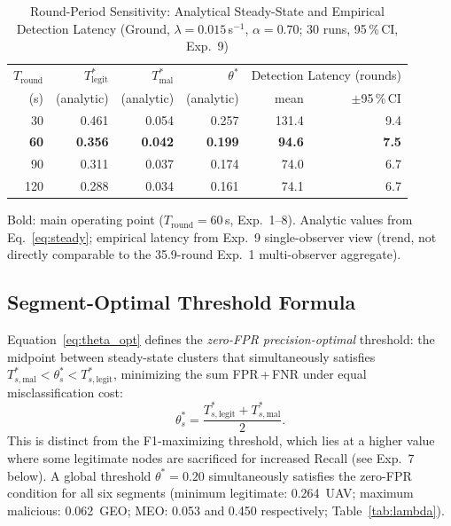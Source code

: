 \documentclass[journal,twoside,10pt]{IEEEtran}
\begin{document}
\begin{table}[t]
\centering
\caption{Round-Period Sensitivity: Analytical Steady-State and
         Empirical Detection Latency (Ground, $\lambda\!=\!0.015$\,s$^{-1}$,
         $\alpha\!=\!0.70$; 30 runs, 95\,\%\,CI, Exp.~9)}
\label{tab:tround_sensitivity}
\renewcommand{\arraystretch}{1.1}
\small
\begin{tabular}{rrrrrr}
\toprule
$T_{\mathrm{round}}$ & $T^*_{\mathrm{legit}}$ &
$T^*_{\mathrm{mal}}$ & $\theta^*$ &
\multicolumn{2}{c}{Detection Latency (rounds)} \\
(s) & (analytic) & (analytic) & (analytic) & mean & $\pm$95\,\%\,CI \\
\midrule
 30 & 0.461 & 0.054 & 0.257 & 131.4 & 9.4 \\
\textbf{60} & \textbf{0.356} & \textbf{0.042} & \textbf{0.199}
    & \textbf{94.6} & \textbf{7.5} \\
 90 & 0.311 & 0.037 & 0.174 &  74.0 & 6.7 \\
120 & 0.288 & 0.034 & 0.161 &  74.1 & 6.7 \\
\bottomrule
\end{tabular}
{\footnotesize Bold: main operating point ($T_{\mathrm{round}}\!=\!60$\,s,
 Exp.~1--8). Analytic values from Eq.~\eqref{eq:steady}; empirical
 latency from Exp.~9 single-observer view (trend, not directly
 comparable to the 35.9-round Exp.~1 multi-observer aggregate).}
\end{table}

\subsection{Segment-Optimal Threshold Formula}

Equation~\eqref{eq:theta_opt} defines the \emph{zero-FPR
precision-optimal} threshold: the midpoint between steady-state
clusters that simultaneously satisfies
$T^*_{s,\mathrm{mal}} < \theta^*_s < T^*_{s,\mathrm{legit}}$,
minimizing the sum FPR\,+\,FNR under equal misclassification cost:
\begin{equation}
  \theta^*_s =
    \frac{T^*_{s,\mathrm{legit}} + T^*_{s,\mathrm{mal}}}{2}.
  \label{eq:theta_opt}
\end{equation}
This is distinct from the F1-maximizing threshold, which lies at
a higher value where some legitimate nodes are sacrificed for
increased Recall (see Exp.~7 below).
A global threshold $\theta^*\!=\!0.20$ simultaneously satisfies the
zero-FPR condition for all six segments (minimum legitimate:
0.264~UAV; maximum malicious: 0.062~GEO; MEO: 0.053 and 0.450
respectively; Table~\ref{tab:lambda}).
\end{document}
